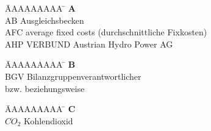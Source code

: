 %
%

\pagestyle{headings}



\begin{tabbing}
	\hspace{0.0cm}  \= AAAAAAAAA \=       \hspace{2cm} \kill
	\> \textbf{A} 	\> \\
	\> AB			\> Ausgleichsbecken\\
	\> AFC     		\> average fixed costs (durchschnittliche Fixkosten)\\
	\> AHP 			\> VERBUND Austrian Hydro Power AG\\
\end{tabbing} 

\vspace*{-1.5cm}
\begin{tabbing}
	\hspace{0.0cm}  \= AAAAAAAAA \=       \hspace{2cm} \kill
	\> \textbf{B} 	\> \\
	\> BGV 			\> Bilanzgruppenverantwortlicher\\
	\> bzw. 		\> beziehungsweise\\
\end{tabbing}

\vspace*{-1.5cm}
\begin{tabbing}
	\hspace{0.0cm}  \= AAAAAAAAA \=       \hspace{2cm} \kill
	\>\textbf{C} 	\> \\
	\> $CO_2$ 		\> Kohlendioxid\\
\end{tabbing} 

